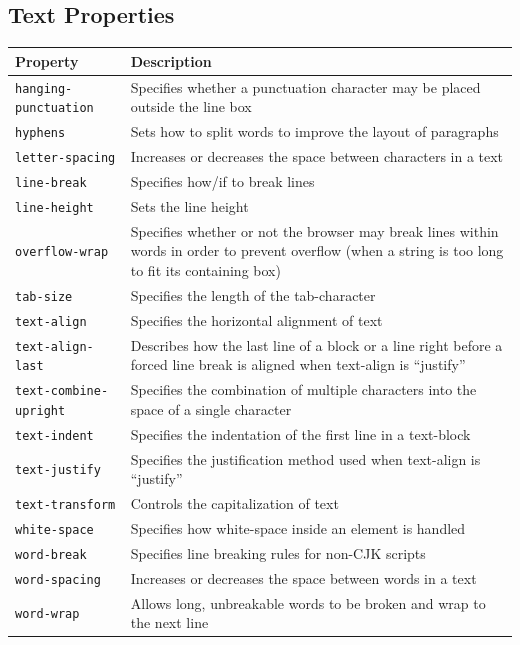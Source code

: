 \documentclass[11pt, letterpaper]{article}
\begin{document}
		\subsection{Text Properties}
			\begin{longtable}{p{5cm} p{10cm}}
				\toprule
				Property & Description \\\midrule
				\texttt{hanging-punctuation} & Specifies whether a punctuation character may be placed outside the line box \\\midrule
				\texttt{hyphens} & Sets how to split words to improve the layout of paragraphs \\\midrule
				\texttt{letter-spacing} & Increases or decreases the space between characters in a text \\\midrule
				\texttt{line-break} & Specifies how/if to break lines \\\midrule
				\texttt{line-height} & Sets the line height \\\midrule
				\texttt{overflow-wrap} & Specifies whether or not the browser may break lines within words in order to prevent overflow (when a string is too long to fit its containing box)\\\midrule
				\texttt{tab-size} & Specifies the length of the tab-character \\\midrule
				\texttt{text-align} & Specifies the horizontal alignment of text \\\midrule
				\texttt{text-align-last} & Describes how the last line of a block or a line right before a forced line break is aligned when text-align is ``justify'' \\\midrule
				\texttt{text-combine-upright} & Specifies the combination of multiple characters into the space of a single character \\\midrule
				\texttt{text-indent} & Specifies the indentation of the first line in a text-block \\\midrule
				\texttt{text-justify} & Specifies the justification method used when text-align is ``justify'' \\\midrule
				\texttt{text-transform} & Controls the capitalization of text \\\midrule
				\texttt{white-space} & Specifies how white-space inside an element is handled \\\midrule
				\texttt{word-break} & Specifies line breaking rules for non-CJK scripts \\\midrule
				\texttt{word-spacing} & Increases or decreases the space between words in a text \\\midrule
				\texttt{word-wrap} & Allows long, unbreakable words to be broken and wrap to the next line \\\midrule
			\end{longtable}
\end{document}

